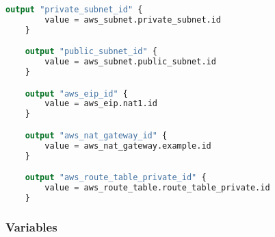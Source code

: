 \begin{lstlisting}[language=terraform]
    output "private_subnet_id" {
        value = aws_subnet.private_subnet.id
    }

    output "public_subnet_id" {
        value = aws_subnet.public_subnet.id
    }

    output "aws_eip_id" {
        value = aws_eip.nat1.id
    }

    output "aws_nat_gateway_id" {
        value = aws_nat_gateway.example.id
    }

    output "aws_route_table_private_id" {
        value = aws_route_table.route_table_private.id
    }
\end{lstlisting}

\subsubsection{
{Variables}}
\label{sec:Variables}

